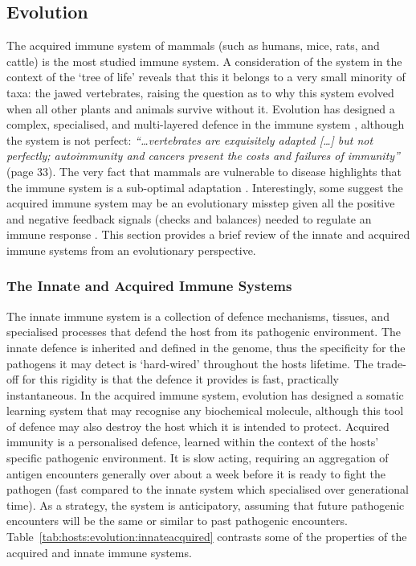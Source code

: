 \subsection{Evolution}
\label{sec:hosts:biology:evolution}
The acquired immune system of mammals (such as humans, mice, rats, and cattle) is the most studied immune system. A consideration of the system in the context of the `tree of life' reveals that this it belongs to a very small minority of taxa: the jawed vertebrates, raising the question as to why this system evolved when all other plants and animals survive without it. Evolution has designed a complex, specialised, and multi-layered defence in the immune system \cite{Danilova2006}, although the system is not perfect: \emph{``\ldots vertebrates are exquisitely adapted [\ldots] but not perfectly; autoimmunity and cancers present the costs and failures of immunity''} \cite{Rinkevich2004} (page 33). The very fact that mammals are vulnerable to disease highlights that the immune system is a sub-optimal adaptation \cite{Nesse2005}. Interestingly, some suggest the acquired immune system may be an evolutionary misstep given all the positive and negative feedback signals (checks and balances) needed to regulate an immune response \cite{Hedrick2004}.
This section provides a brief review of the innate and acquired immune systems from an evolutionary perspective. 

%
%
\subsubsection{The Innate and Acquired Immune Systems}
The innate immune system is a collection of defence mechanisms, tissues, and specialised processes that defend the host from its pathogenic environment. The innate defence is inherited and defined in the genome, thus the specificity for the pathogens it may detect is `hard-wired' throughout the hosts lifetime. The trade-off for this rigidity is that the defence it provides is fast, practically instantaneous. In the acquired immune system, evolution has designed a somatic learning system that may recognise any biochemical molecule, although this tool of defence may also destroy the host which it is intended to protect. Acquired immunity is a personalised defence, learned within the context of the hosts' specific pathogenic environment. It is slow acting, requiring an aggregation of antigen encounters generally over about a week before it is ready to fight the pathogen (fast compared to the innate system which specialised over generational time). As a strategy, the system is anticipatory, assuming that future pathogenic encounters will be the same or similar to past pathogenic encounters. Table~\ref{tab:hosts:evolution:innateacquired} contrasts some of the properties of the acquired and innate immune systems.

